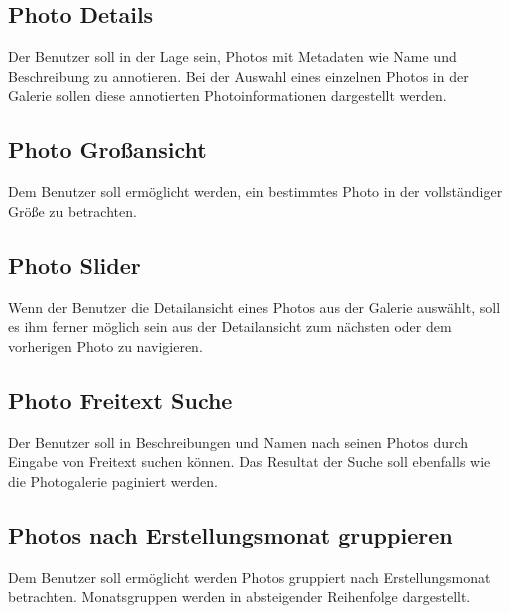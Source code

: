 \subsection{Photo Details}
\label{sec:spec:photo_details}

Der Benutzer soll in der Lage sein, Photos mit Metadaten wie Name und Beschreibung zu annotieren. Bei der Auswahl eines einzelnen Photos in der Galerie sollen diese annotierten Photoinformationen dargestellt werden.

\subsection{Photo Großansicht}

Dem Benutzer soll ermöglicht werden, ein bestimmtes Photo in der vollständiger Größe zu betrachten.

\subsection{Photo Slider}
\label{sec:spec:photo_slider}


Wenn der Benutzer die Detailansicht eines Photos aus der Galerie auswählt, soll es ihm ferner möglich sein aus der Detailansicht zum nächsten oder dem vorherigen Photo zu navigieren.

\subsection{Photo Freitext Suche}
\label{sec:photo_search}

Der Benutzer soll in Beschreibungen und Namen nach seinen Photos durch Eingabe von Freitext suchen können. Das Resultat der Suche soll ebenfalls wie die Photogalerie paginiert werden.

\subsection{Photos nach Erstellungsmonat gruppieren}
\label{sec:spec:photo_groups}

Dem Benutzer soll ermöglicht werden Photos gruppiert nach Erstellungsmonat betrachten. Monatsgruppen werden in absteigender Reihenfolge dargestellt.


